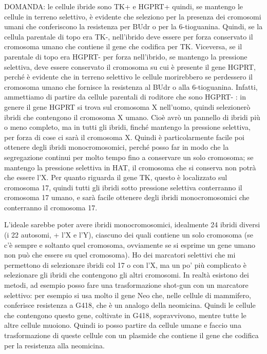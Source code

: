 \documentclass[11pt]{book}
\begin{document}
DOMANDA: le cellule ibride sono TK+ e HGPRT+ quindi, se mantengo le cellule in terreno selettivo, è evidente che seleziono per la presenza dei cromosomi umani che conferiscono la resistenza per BUdr o per la 6-tioguanina. Quindi, se la cellula parentale di topo era TK-, nell’ibrido deve essere per forza conservato il cromosoma umano che contiene il gene che codifica per TK. Viceversa, se il parentale di topo era HGPRT- per forza nell’ibrido, se mantengo la pressione selettiva, deve essere conservato il cromosoma su cui è presente il gene HGPRT, perché è evidente che in terreno selettivo le cellule morirebbero se perdessero il cromosoma umano che fornisce la resistenza al BUdr o alla 6-tioguanina.
Infatti, ammettiamo di partire da cellule parentali di roditore che sono HGPRT- : in genere il gene HGPRT si trova sul cromosoma X nell’uomo, quindi selezionerò ibridi che contengono il cromosoma X umano. Cioè avrò un pannello di ibridi più o meno completo, ma in tutti gli ibridi, finché mantengo la pressione selettiva, per forza di cose ci sarà il cromosoma X. Quindi è particolarmente facile poi ottenere degli ibridi monocromosomici, perché posso far in modo che la segregazione continui per molto tempo fino a conservare un solo cromosoma; se mantengo la pressione selettiva in HAT, il cromosoma che si conserva non potrà che essere l’X. Per quanto riguarda il gene TK, questo è localizzato sul cromosoma 17, quindi tutti gli ibridi sotto pressione selettiva conterranno il cromosoma 17 umano, e sarà facile ottenere degli ibridi monocromosomici che conterranno il cromosoma 17. 
 
L’ideale sarebbe poter avere ibridi monocromosomici, idealmente 24 ibridi diversi (i 22 autosomi, + l’X e l’Y), ciascuno dei quali contiene un solo cromosoma (se c’è sempre e soltanto quel cromosoma, ovviamente se si esprime un gene umano non può che essere su quel cromosoma). 
Ho dei marcatori selettivi che mi permettono di selezionare ibridi col 17 o con l’X, ma un po’ più complicato è selezionare gli ibridi che contengono gli altri cromosomi. 
In realtà esistono dei metodi, ad esempio posso fare una trasformazione shot-gun con un marcatore selettivo: per esempio si usa molto il gene Neo che, nelle cellule di mammifero, conferisce resistenza a G418, che è un analogo della neomicina. Quindi le cellule che contengono questo gene, coltivate in G418, sopravvivono, mentre tutte le altre cellule muoiono. Quindi io posso partire da cellule umane e faccio una trasformazione di queste cellule con un plasmide che contiene il gene che codifica per la resistenza alla neomicina.
\end{document}

